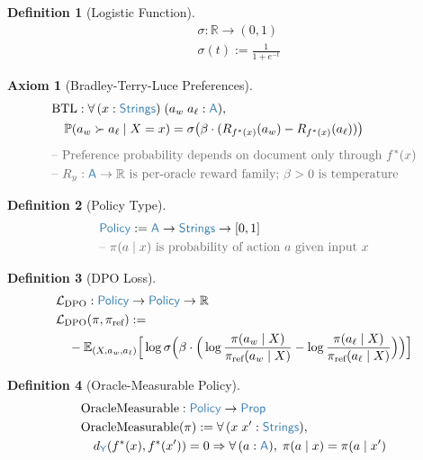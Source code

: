 \documentclass[11pt]{article}
\theoremstyle{definition}
\newtheorem{axiomenv}{Axiom}
\newtheorem{defnenv}{Definition}
\theoremstyle{plain}
\newcommand{\ty}[1]{\textcolor{type}{\mathsf{#1}}}
\newcommand{\fn}[1]{\mathrm{#1}}
\newcommand{\cmt}[1]{\textcolor{comment}{\text{-- #1}}}
\newcommand{\all}{\forall\,}
\newcommand{\arr}{\to}
\newcommand{\Arr}{\Rightarrow}
\newcommand{\defeq}{:=}
\newcommand{\Strings}{\ty{Strings}}
\newcommand{\Y}{\ty{Y}}
\newcommand{\A}{\ty{A}}
\newcommand{\R}{\mathbb{R}}
\newcommand{\Prop}{\ty{Prop}}
\newcommand{\fstar}{f^*}
\newcommand{\dY}{d_{\Y}}
\newcommand{\E}{\mathbb{E}}
\newcommand{\Prob}{\mathbb{P}}
\begin{document}
\begin{defnenv}[Logistic Function]
\label{def:sigmoid}
\begin{align*}
&\sigma : \R \arr (0, 1) \\
&\sigma(t) \defeq \frac{1}{1 + e^{-t}}
\end{align*}
\end{defnenv}

\begin{axiomenv}[Bradley-Terry-Luce Preferences]
\label{ax:BTL}
\begin{align*}
&\fn{BTL} : \all (x : \Strings)\; (a_w\; a_\ell : \A), \\
&\quad \Prob(a_w \succ a_\ell \mid X = x) = \sigma\big(\beta \cdot (R_{\fstar(x)}(a_w) - R_{\fstar(x)}(a_\ell))\big) \\[6pt]
&\cmt{Preference probability depends on document only through $\fstar(x)$} \\
&\cmt{$R_y : \A \arr \R$ is per-oracle reward family; $\beta > 0$ is temperature}
\end{align*}
\end{axiomenv}

\begin{defnenv}[Policy Type]
\label{def:policy}
\begin{align*}
&\ty{Policy} \defeq \A \arr \Strings \arr [0, 1] \\
&\cmt{$\pi(a \mid x)$ is probability of action $a$ given input $x$}
\end{align*}
\end{defnenv}

\begin{defnenv}[DPO Loss]
\label{def:dpo_loss}
\begin{align*}
&\mathcal{L}_{\text{DPO}} : \ty{Policy} \arr \ty{Policy} \arr \R \\
&\mathcal{L}_{\text{DPO}}(\pi, \pi_{\text{ref}}) \defeq \\
&\quad -\E_{(X, a_w, a_\ell)}\Big[\log \sigma\Big(\beta \cdot \Big(\log\frac{\pi(a_w \mid X)}{\pi_{\text{ref}}(a_w \mid X)} - \log\frac{\pi(a_\ell \mid X)}{\pi_{\text{ref}}(a_\ell \mid X)}\Big)\Big)\Big]
\end{align*}
\end{defnenv}

\begin{defnenv}[Oracle-Measurable Policy]
\label{def:oracle_meas}
\begin{align*}
&\fn{OracleMeasurable} : \ty{Policy} \arr \Prop \\
&\fn{OracleMeasurable}(\pi) \defeq \all (x\; x' : \Strings), \\
&\quad \dY(\fstar(x), \fstar(x')) = 0 \Arr \all (a : \A),\; \pi(a \mid x) = \pi(a \mid x')
\end{align*}
\end{defnenv}
\end{document}

